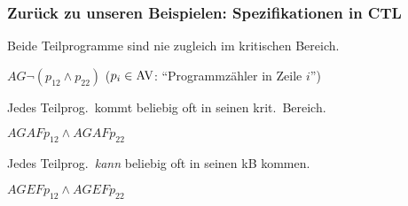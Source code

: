 \begin{frame}
  \frametitle{Zurück zu unseren Beispielen: Spezifikationen in CTL}

  \begin{Itemize}
    \item
      Beide Teilprogramme sind nie zugleich im kritischen Bereich.
      \par\smallskip
      $AG\neg (p_{12} \land p_{22})$ \hfill {\footnotesize ($p_i \in \textup{AV}$: "`Programmzähler in Zeile $i$"')}
      \par\smallskip
    \item<2->
      Jedes Teilprog.\ kommt beliebig oft in seinen krit.\ Bereich.
      \par\smallskip
      $AGAF p_{12} \land AGAF p_{22}$
      \par\smallskip
    \item<3->
      Jedes Teilprog.\ \emph{kann} beliebig oft in seinen kB kommen.
      \par\smallskip
      $AGEF p_{12} \land AGEF p_{22}$
  \end{Itemize}

  \par\bigskip

\end{frame}

